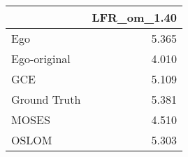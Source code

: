\begin{tabular}{lr}
\toprule
{} & LFR_om_1.40 \\
\midrule
Ego          &       5.365 \\
Ego-original &       4.010 \\
GCE          &       5.109 \\
Ground Truth &       5.381 \\
MOSES        &       4.510 \\
OSLOM        &       5.303 \\
\bottomrule
\end{tabular}
